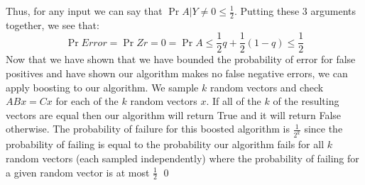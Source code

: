 \documentclass[12pt]{article}
\begin{document}
\begin{solution}
\begin{itemize}
    Thus, for any input we can say that $\Pr{A|Y\neq0} \leq \frac{1}{2}$. Putting these $3$ arguments together, we see that:
    \[
    \Pr{Error} = \Pr{Zr=0} = \Pr{A} \leq \frac{1}{2}q + \frac{1}{2}(1-q) \leq \frac{1}{2}
    \]
    Now that we have shown that we have bounded the probability of error for false positives and have shown our algorithm makes no false negative errors, we can apply boosting to our algorithm. We sample $k$ random vectors and check $ABx = Cx$ for each of the $k$ random vectors $x$. If all of the $k$ of the resulting vectors are equal then our algorithm will return True and it will return False otherwise. The probability of failure for this boosted algorithm is $\frac{1}{2^k}$ since the probability of failing is equal to the probability our algorithm fails for all $k$ random vectors (each sampled independently) where the probability of failing for a given random vector is at most $\frac{1}{2}$ \qed
    
\end{itemize}
\end{solution}
\end{document}
